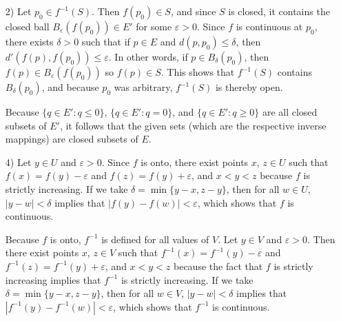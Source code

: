 \documentclass[a4paper,12pt]{article}
\begin{document}
\begin{enumerate}
        \item[2)]
            Let $p_0 \in f^{-1}(S)$. Then $f(p_0) \in S$, and since $S$ is closed, it contains the closed ball $B_\varepsilon(f(p_0)) \in E'$ for some $\varepsilon > 0$. Since $f$ is continuous at $p_0$, there exists $\delta > 0$ such that if $p \in E$ and $d(p, p_0) \leq \delta$, then $d'(f(p), f(p_0)) \leq \varepsilon$. In other words, if $p \in B_\delta(p_0)$, then $f(p) \in B_\varepsilon(f(p_0))$ so $f(p) \in S$. This shows that $f^{-1}(S)$ contains $B_\delta(p_0)$, and because $p_0$ was arbitrary, $f^{-1}(S)$ is thereby open. \par
            Because $\{q \in E' : q \leq 0\}$, $\{q \in E' : q = 0\}$, and $\{q \in E' : q \geq 0\}$ are all closed subsets of $E'$, it follows that the given sets (which are the respective inverse mappings) are closed subsets of $E$.

        \item[4)]
            Let $y \in U$ and $\varepsilon > 0$. Since $f$ is onto, there exist points $x$, $z \in U$ such that $f(x) = f(y) - \varepsilon$ and $f(z) = f(y) + \varepsilon$, and $x < y < z$ because $f$ is strictly increasing. If we take $\delta = \min\{y - x, z - y\}$, then for all $w \in U$, $|y - w| < \delta$ implies that $|f(y) - f(w)| < \varepsilon$, which shows that $f$ is continuous. \par
            Because $f$ is onto, $f^{-1}$ is defined for all values of $V$. Let $y \in V$ and $\varepsilon > 0$. Then there exist points $x$, $z \in V$ such that $f^{-1}(x) = f^{-1}(y) - \varepsilon$ and $f^{-1}(z) = f^{-1}(y) + \varepsilon$, and $x < y < z$ because the fact that $f$ is strictly increasing implies that $f^{-1}$ is strictly increasing. If we take $\delta = \min\{y - x, z - y\}$, then for all $w \in V$, $|y - w| < \delta$ implies that $|f^{-1}(y) - f^{-1}(w)| < \varepsilon$, which shows that $f^{-1}$ is continuous. \par
    \end{enumerate}
\end{document}
